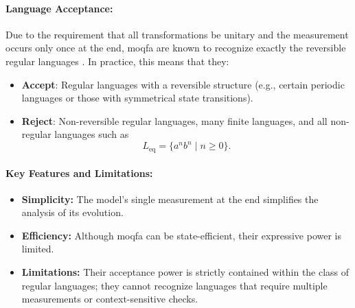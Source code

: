 \paragraph{Language Acceptance:}  
Due to the requirement that all transformations be unitary and the measurement occurs only once at the end, \gls{moqfa} are known to recognize exactly the reversible regular languages \cite{BrodskyPippenger2004,bertoni2001regular}. In practice, this means that they:
\begin{itemize}
    \item \textbf{Accept}: Regular languages with a reversible structure (e.g., certain periodic languages or those with symmetrical state transitions).
    \item \textbf{Reject}: Non-reversible regular languages, many finite languages, and all non-regular languages such as 
    \[
    L_{\text{eq}} = \{a^n b^n \mid n \geq 0\}.
    \]
\end{itemize}

\paragraph{Key Features and Limitations:}
\begin{itemize}
    \item \textbf{Simplicity:} The model’s single measurement at the end simplifies the analysis of its evolution.
    \item \textbf{Efficiency:} Although \gls{moqfa} can be state-efficient, their expressive power is limited.
    \item \textbf{Limitations:} Their acceptance power is strictly contained within the class of regular languages; they cannot recognize languages that require multiple measurements or context-sensitive checks.
\end{itemize}

